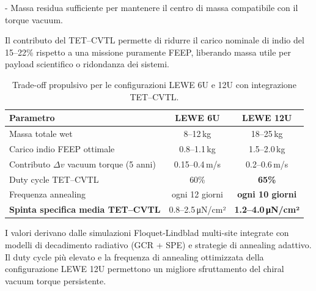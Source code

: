\documentclass[11pt,a4paper]{article}
\theoremstyle{plain}
\theoremstyle{definition}
\begin{document}
- Massa residua sufficiente per mantenere il centro di massa compatibile con il torque vacuum.

\vspace{0.2cm}

Il contributo del TET--CVTL permette di ridurre il carico nominale di indio del 15–22\% rispetto a una missione puramente FEEP, liberando massa utile per payload scientifico o ridondanza dei sistemi.



\vspace{0.2cm}

\begin{table}[H]
\centering
\small
\renewcommand{\arraystretch}{1.3}

\begin{tabular}{lcc}
\toprule
\rowcolor{teal!15}
\textbf{Parametro} & 
\textbf{LEWE 6U} & 
\textbf{LEWE 12U} \\
\midrule
Massa totale wet                  & 8--12\,kg          & 18--25\,kg \\
Carico indio FEEP ottimale        & 0.8--1.1\,kg       & 1.5--2.0\,kg \\
Contributo $\Delta v$ vacuum torque (5 anni) & 0.15--0.4\,m/s   & 0.2--0.6\,m/s \\
Duty cycle TET--CVTL              & 60\%               & \textbf{65\%} \\
Frequenza annealing               & ogni 12 giorni     & \textbf{ogni 10 giorni} \\
\midrule
\rowcolor{emerald!12}
\textbf{Spinta specifica media TET--CVTL} & 0.8--2.5\,\si{\micro N/cm²} & \textbf{1.2--4.0\,\si{\micro N/cm²}} \\
\bottomrule
\end{tabular}

\vspace{10pt}


\vspace{0.2cm}

{\small I valori derivano dalle simulazioni Floquet-Lindblad multi-site integrate con modelli di decadimento radiativo (GCR + SPE) e strategie di annealing adattivo. 
Il duty cycle più elevato e la frequenza di annealing ottimizzata della configurazione LEWE 12U permettono un migliore sfruttamento del chiral vacuum torque persistente.}

\caption{Trade-off propulsivo per le configurazioni LEWE 6U e 12U con integrazione TET--CVTL.}
\label{tab:lewe_trade}
\end{table}
\end{document}
